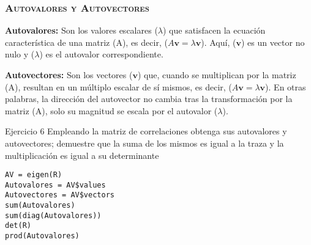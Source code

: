 \documentclass[16.5pt]{beamer}
\begin{document}
{
\begin{frame}
\frametitle{\textsc{\textbf{Autovalores y Autovectores}}}
\hspace*{-5mm}
\vspace*{-1mm} 
\vspace{0.3cm}

\textbf{Autovalores:} Son los valores escalares ($\lambda$) que satisfacen la ecuación característica de una matriz (A), es decir, ($A\mathbf{v} = \lambda\mathbf{v}$). Aquí, ($\mathbf{v}$) es un vector no nulo y ($\lambda$) es el autovalor correspondiente.

\textbf{Autovectores:} Son los vectores ($\mathbf{v}$) que, cuando se multiplican por la matriz (A), resultan en un múltiplo escalar de sí mismos, es decir, ($A\mathbf{v} = \lambda\mathbf{v}$). En otras palabras, la dirección del autovector no cambia tras la transformación por la matriz (A), solo su magnitud se escala por el autovalor ($\lambda$).

\begin{bclogo}{Ejercicio 6}
 {\tiny\color{blue} Empleando la matriz de correlaciones obtenga sus autovalores y autovectores; demuestre que la suma de los mismos es igual a la traza y la multiplicación es igual a su determinante}
\begin{lstlisting}[basicstyle=\tiny]
AV = eigen(R)
Autovalores = AV$values
Autovectores = AV$vectors
sum(Autovalores)
sum(diag(Autovalores))
det(R)
prod(Autovalores)
\end{lstlisting}
\end{bclogo}
\end{frame}
}

\end{document}
